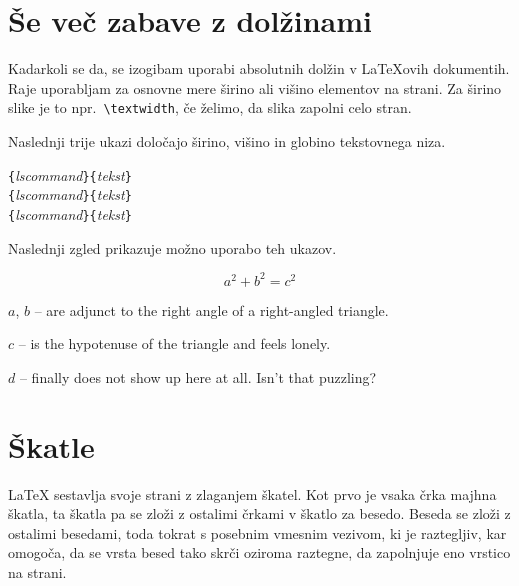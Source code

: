 

\section{Še več zabave z dolžinami}

Kadarkoli se da, se izogibam uporabi absolutnih dolžin v 
\LaTeX{}ovih dokumentih. Raje uporabljam za osnovne mere širino ali višino
elementov na strani. Za širino slike je to npr.~\verb|\textwidth|, če želimo, da slika zapolni celo stran.

Naslednji trije ukazi določajo širino, višino in globino tekstovnega niza.

\begin{lscommand}
\verb|{|\emph{lscommand}\verb|}{|\emph{tekst}\verb|}|\\
\verb|{|\emph{lscommand}\verb|}{|\emph{tekst}\verb|}|\\
\verb|{|\emph{lscommand}\verb|}{|\emph{tekst}\verb|}|
\end{lscommand}

\noindent Naslednji zgled prikazuje možno uporabo teh ukazov.

\begin{example}
\flushleft
\newenvironment{vardesc}[1]{%
  \settowidth{\parindent}{#1:\ }
  \makebox[0pt][r]{#1:\ }}{}

\begin{displaymath}
a^2+b^2=c^2
\end{displaymath}

\begin{vardesc}{Where}$a$, 
$b$ -- are adjunct to the right 
angle of a right-angled triangle.  

$c$ -- is the hypotenuse of 
the triangle and feels lonely.

$d$ -- finally does not show up 
here at all. Isn't that puzzling?
\end{vardesc}
\end{example}

\section{Škatle}
\LaTeX{} sestavlja svoje strani z zlaganjem škatel. Kot prvo je vsaka črka
majhna škatla, ta škatla pa se zloži z ostalimi črkami v škatlo za besedo. Beseda se 
zloži z ostalimi besedami, toda tokrat s posebnim vmesnim vezivom,
ki je raztegljiv, kar omogoča, da se vrsta besed tako skrči oziroma raztegne, da zapolnjuje
eno vrstico na strani.

